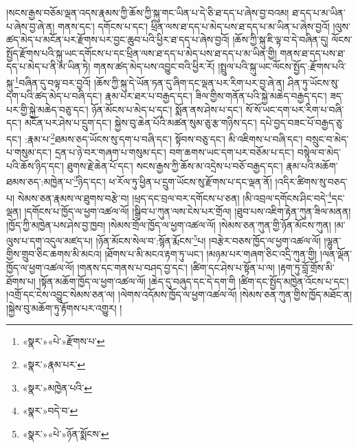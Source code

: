 །སངས་རྒྱས་བཅོམ་ལྡན་འདས་རྣམས་ཀྱི་ཆོས་ཀྱི་སྐུ་གང་ཡིན་པ་དེ་ཅི་ཐ་དད་པ་ཞེས་བྱ་བའམ། ཐ་དད་པ་མ་ཡིན་པ་ཞེས་བྱ་ཞེ་ན། གནས་དང་། དགོངས་པ་དང་། ཕྲིན་ལས་ཐ་དད་པ་མེད་པས་ཐ་དད་པ་མ་ཡིན་པ་ཞེས་བྱའོ། །ལུས་ཚད་མེད་པ་མངོན་པར་རྫོགས་པར་བྱང་ཆུབ་པའི་ཕྱིར་ཐ་དད་པ་ཞེས་བྱའོ། །ཆོས་ཀྱི་སྐུ་ཇི་ལྟ་བ་དེ་བཞིན་དུ། ལོངས་སྤྱོད་རྫོགས་པའི་སྐུ་ཡང་དགོངས་པ་དང་ཕྲིན་ལས་ཐ་དད་པ་མེད་པས་ཐ་དད་པ་མ་ཡིན་གྱི། གནས་ཐ་དད་པས་ཐ་དད་པ་མེད་པ་ནི་མ་ཡིན་ཏེ། གནས་ཚད་མེད་པས་འབྱུང་བའི་ཕྱིར་རོ། །སྤྲུལ་པའི་སྐུ་ཡང་ལོངས་སྤྱོད་:རྫོགས་པའི་སྐུ་\footnote{«སྣར་»«པེ་»རྫོགས་པ་}བཞིན་དུ་བལྟ་བར་བྱའོ། །ཆོས་ཀྱི་སྐུ་དེ་ཡོན་ཏན་དུ་ཞིག་དང་ལྡན་པར་རིག་པར་བྱ་ཞེ་ན། ཤིན་ཏུ་ཡོངས་སུ་དག་པའི་ཚད་མེད་པ་བཞི་དང་། རྣམ་པར་ཐར་པ་བརྒྱད་དང་། ཟིལ་གྱིས་གནོན་པའི་སྐྱེ་མཆེད་བརྒྱད་དང་། ཟད་པར་གྱི་སྐྱེ་མཆེད་བཅུ་དང་། ཉོན་མོངས་པ་མེད་པ་དང་། སྨོན་ནས་ཤེས་པ་དང་། སོ་སོ་ཡང་དག་པར་རིག་པ་བཞི་དང་། མངོན་པར་ཤེས་པ་དྲུག་དང་། སྐྱེས་བུ་ཆེན་པོའི་མཚན་སུམ་ཅུ་རྩ་གཉིས་དང་། དཔེ་བྱད་བཟང་པོ་བརྒྱད་ཅུ་དང་། :རྣམ་པ་\footnote{«སྣར་»རྣམ་པར་}ཐམས་ཅད་ཡོངས་སུ་དག་པ་བཞི་དང་། སྟོབས་བཅུ་དང་། མི་འཇིགས་པ་བཞི་དང་། བསྲུང་བ་མེད་པ་གསུམ་དང་། དྲན་པ་ཉེ་བར་གཞག་པ་གསུམ་དང་། བག་ཆགས་ཡང་དག་པར་བཅོམ་པ་དང་། བསྙེལ་བ་མེད་པའི་ཆོས་ཉིད་དང་། ཐུགས་རྗེ་ཆེན་པོ་དང་། སངས་རྒྱས་ཀྱི་ཆོས་མ་འདྲེས་པ་བཅོ་བརྒྱད་དང་། རྣམ་པའི་མཆོག་ཐམས་ཅད་:མཁྱེན་པ་\footnote{«སྣར་»མཁྱེན་པའི་}ཉིད་དང་། ཕ་རོལ་ཏུ་ཕྱིན་པ་དྲུག་ཡོངས་སུ་རྫོགས་པ་དང་ལྡན་ནོ། །འདིར་ཚིགས་སུ་བཅད་པ། སེམས་ཅན་རྣམས་ལ་ཐུགས་བརྩེ་བ། །ཕྲད་དང་བྲལ་བར་དགོངས་པ་ཅན། །མི་འབྲལ་དགོངས་ཤིང་བདེ་\footnote{«སྣར་»བདེ་བ་}དང་ལྡན། །དགོངས་པ་ཁྱོད་ལ་ཕྱག་འཚལ་ལོ། །སྒྲིབ་པ་ཀུན་ལས་ངེས་པར་གྲོལ། །ཐུབ་པས་འཇིག་རྟེན་ཀུན་ཟིལ་མནན། །ཁྱོད་ཀྱི་མཁྱེན་པས་ཤེས་བྱ་ཁྱབ། །སེམས་གྲོལ་ཁྱོད་ལ་ཕྱག་འཚལ་ལོ། །སེམས་ཅན་ཀུན་གྱི་ཉོན་མོངས་ཀུན། །མ་ལུས་པ་དག་འདུལ་མཛད་པ། །ཉོན་མོངས་སེལ་བ་:སྙོན་རྨོངས་\footnote{«སྣར་»«པེ་»ཉོན་སྨོངས་}པ། །བརྩེར་བཅས་ཁྱོད་ལ་ཕྱག་འཚལ་ལོ། །ལྷུན་གྱིས་གྲུབ་ཅིང་ཆགས་མི་མངའ། །ཐོགས་པ་མི་མངའ་རྟག་ཏུ་ཡང་། །མཉམ་པར་གཞག་ཅིང་འདྲི་ཀུན་གྱི། །ལན་ལྡོན་ཁྱོད་ལ་ཕྱག་འཚལ་ལོ། །གནས་དང་གནས་པ་བཤད་བྱ་དང་། །ཚིག་དང་ཤེས་པ་སྟོན་པ་ལ། །རྟག་ཏུ་བློ་གྲོས་མི་ཐོགས་པ། །སྟོན་མཆོག་ཁྱོད་ལ་ཕྱག་འཚལ་ལོ། །ཆེད་དུ་བཞུད་དང་དེ་དག་གི །ཚིག་དང་སྤྱོད་མཁྱེན་འོངས་པ་དང་། །འགྲོ་དང་ངེས་འབྱུང་སེམས་ཅན་ལ། །ལེགས་འདོམས་ཁྱོད་ལ་ཕྱག་འཚལ་ལོ། །སེམས་ཅན་ཀུན་གྱིས་ཁྱོད་མཐོང་ན། །སྐྱེས་བུ་མཆོག་ཏུ་རྟོགས་པར་འགྱུར། །
